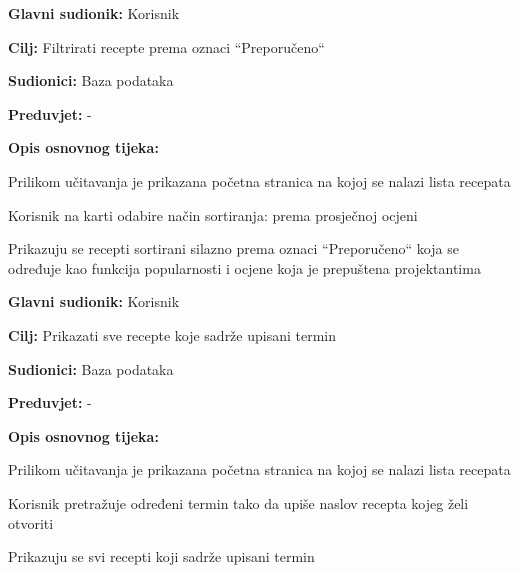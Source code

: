 \noindent {}
\begin{packed_item}

	\item \textbf{Glavni sudionik: } Korisnik
	\item  \textbf{Cilj:} Filtrirati recepte prema oznaci “Preporučeno“
	\item  \textbf{Sudionici:} Baza podataka
	\item  \textbf{Preduvjet:} -
	\item  \textbf{Opis osnovnog tijeka:}

	\item[] \begin{packed_enum}

		\item Prilikom učitavanja je prikazana početna stranica na kojoj se nalazi lista recepata
		\item Korisnik na karti odabire način sortiranja: prema prosječnoj ocjeni
		\item Prikazuju se recepti sortirani silazno prema oznaci “Preporučeno“ koja se određuje kao funkcija popularnosti i ocjene koja je prepuštena projektantima

	\end{packed_enum}
\end{packed_item}

\noindent {}
\begin{packed_item}

	\item \textbf{Glavni sudionik: } Korisnik
	\item  \textbf{Cilj:} Prikazati sve recepte koje sadrže upisani termin
	\item  \textbf{Sudionici:} Baza podataka
	\item  \textbf{Preduvjet:} -
	\item  \textbf{Opis osnovnog tijeka:}

	\item[] \begin{packed_enum}

		\item Prilikom učitavanja je prikazana početna stranica na kojoj se nalazi lista recepata
		\item Korisnik pretražuje određeni termin tako da upiše naslov recepta kojeg želi otvoriti
		\item Prikazuju se svi recepti koji sadrže upisani termin

	\end{packed_enum}
\end{packed_item}

